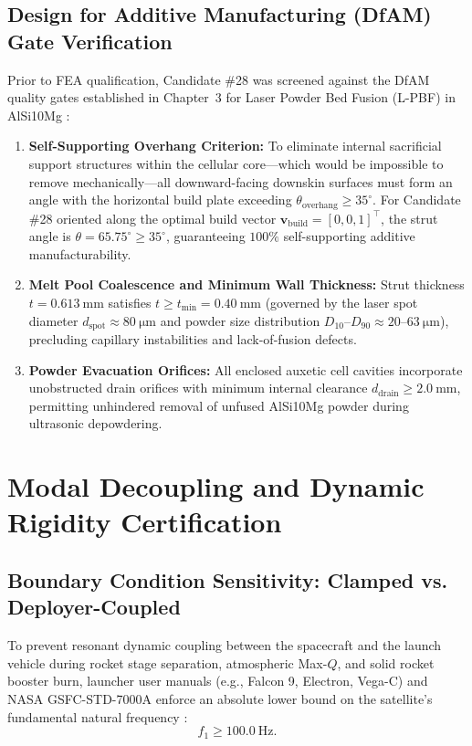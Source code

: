 \subsection{Design for Additive Manufacturing (DfAM) Gate Verification}

Prior to FEA qualification, Candidate \#28 was screened against the DfAM quality gates established in Chapter~3 for Laser Powder Bed Fusion (L-PBF) in AlSi10Mg \cite{nasa2021,khan2024}:
\begin{enumerate}
\item \textbf{Self-Supporting Overhang Criterion:} To eliminate internal sacrificial support structures within the cellular core—which would be impossible to remove mechanically—all downward-facing downskin surfaces must form an angle with the horizontal build plate exceeding $\theta_{\text{overhang}} \ge 35^\circ$. For Candidate \#28 oriented along the optimal build vector $\mathbf{v}_{\text{build}} = [0, 0, 1]^\top$, the strut angle is $\theta = 65.75^\circ \ge 35^\circ$, guaranteeing $100\%$ self-supporting additive manufacturability.
\item \textbf{Melt Pool Coalescence and Minimum Wall Thickness:} Strut thickness $t = \SI{0.613}{\milli\meter}$ satisfies $t \ge t_{\text{min}} = \SI{0.40}{\milli\meter}$ (governed by the laser spot diameter $d_{\text{spot}} \approx \SI{80}{\micro\meter}$ and powder size distribution $D_{10}\text{--}D_{90} \approx 20\text{--}\SI{63}{\micro\meter}$), precluding capillary instabilities and lack-of-fusion defects.
\item \textbf{Powder Evacuation Orifices:} All enclosed auxetic cell cavities incorporate unobstructed drain orifices with minimum internal clearance $d_{\text{drain}} \ge \SI{2.0}{\milli\meter}$, permitting unhindered removal of unfused AlSi10Mg powder during ultrasonic depowdering.
\end{enumerate}

\section{Modal Decoupling and Dynamic Rigidity Certification}
\label{sec:modal_qualification}

\subsection{Boundary Condition Sensitivity: Clamped vs. Deployer-Coupled}

To prevent resonant dynamic coupling between the spacecraft and the launch vehicle during rocket stage separation, atmospheric Max-$Q$, and solid rocket booster burn, launcher user manuals (e.g., Falcon 9, Electron, Vega-C) and NASA GSFC-STD-7000A enforce an absolute lower bound on the satellite's fundamental natural frequency \cite{nasa2013,malavolta2026}:
\begin{equation}
f_1 \ge \SI{100.0}{\hertz}.
\label{eq:modal_requirement}
\end{equation}

